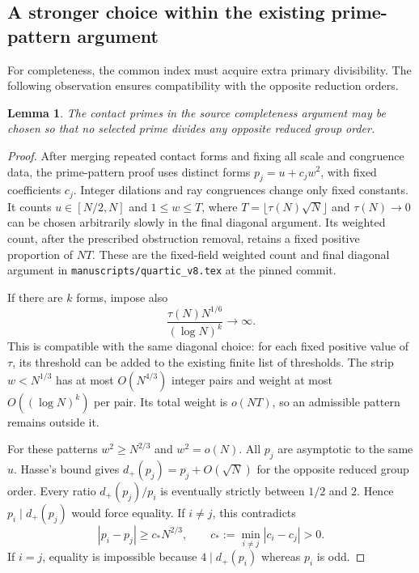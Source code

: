 \documentclass[11pt]{article}
\newtheorem{lemma}[theorem]{Lemma}
\begin{document}
\subsection{A stronger choice within the existing prime-pattern argument}
For completeness, the common index must acquire extra primary divisibility. The following observation ensures compatibility with the opposite reduction orders.

\begin{lemma}\label{lem:separation}
The contact primes in the source completeness argument may be chosen so that no selected prime divides any opposite reduced group order.
\end{lemma}
\begin{proof}
After merging repeated contact forms and fixing all scale and congruence data, the prime-pattern proof uses distinct forms $p_j=u+c_jw^2$, with fixed coefficients $c_j$. Integer dilations and ray congruences change only fixed constants. It counts $u\in[N/2,N]$ and $1\le w\le T$, where $T=\lfloor\tau(N)\sqrt N\rfloor$ and $\tau(N)\to0$ can be chosen arbitrarily slowly in the final diagonal argument. Its weighted count, after the prescribed obstruction removal, retains a fixed positive proportion of $NT$. These are the fixed-field weighted count and final diagonal argument in \nolinkurl{manuscripts/quartic_v8.tex} at the pinned commit.

If there are $k$ forms, impose also
\[
 \frac{\tau(N)N^{1/6}}{(\log N)^k}\longrightarrow\infty.
\]
This is compatible with the same diagonal choice: for each fixed positive value of $\tau$, its threshold can be added to the existing finite list of thresholds. The strip $w<N^{1/3}$ has at most $O(N^{4/3})$ integer pairs and weight at most $O((\log N)^k)$ per pair. Its total weight is $o(NT)$, so an admissible pattern remains outside it.

For these patterns $w^2\ge N^{2/3}$ and $w^2=o(N)$. All $p_j$ are asymptotic to the same $u$. Hasse's bound gives $d_+(p_j)=p_j+O(\sqrt N)$ for the opposite reduced group order. Every ratio $d_+(p_j)/p_i$ is eventually strictly between $1/2$ and $2$. Hence $p_i\mid d_+(p_j)$ would force equality. If $i\ne j$, this contradicts
\[
 |p_i-p_j|\ge c_*N^{2/3},\qquad
 c_*:=\min_{i\ne j}|c_i-c_j|>0.
\]
If $i=j$, equality is impossible because $4\mid d_+(p_i)$ whereas $p_i$ is odd.
\end{proof}
\end{document}
